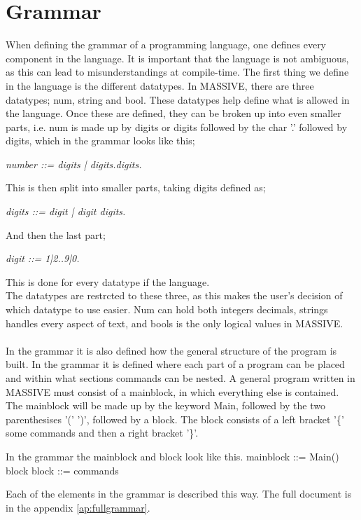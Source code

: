 \section{Grammar}
When defining the grammar of a programming language, one defines every component in the language. It is important that the language is not ambiguous, as this can lead to misunderstandings at compile-time.
The first thing we define in the language is the different datatypes. In MASSIVE, there are three datatypes; num, string and bool. These datatypes help define what is allowed in the language.
Once these are defined, they can be broken up into even smaller parts, i.e. num is made up by digits or digits followed by the char '.' followed by digits, which in the grammar looks like this;\\
\begin{center}
\textit{number ::= digits | digits.digits.}\\
\end{center}
This is then split into smaller parts, taking digits defined as; \\
\begin{center}
\textsl{digits ::= digit | digit digits.}\\
\end{center}
And then the last part;
\begin{center}
\textsl{digit ::= 1|2..9|0.} \\
\end{center}
This is done for every datatype if the language.\\
The datatypes are restrcted to these three, as this makes the user's decision of which datatype to use easier. Num can hold both integers decimals, strings handles every aspect of text, and bools is the only logical values in MASSIVE.\\
\\
In the grammar it is also defined how the general structure of the program is built. In the grammar it is defined where each part of a program can be placed and within what sections commands can be nested. A general program written in MASSIVE must consist of a mainblock, in which everything else is contained. The mainblock will be made up by the keyword Main, followed by the two parenthesises '(' ')', followed by a block.
The block consists of a left bracket '\{' some commands and then a right bracket '\}'. 
\begin{source}{In the grammar the mainblock and block look like this.}{}
mainblock ::= Main() block
block ::= { commands }
\end{source}

Each of the elements in the grammar is described this way. The full document is in the appendix \ref{ap:fullgrammar}.